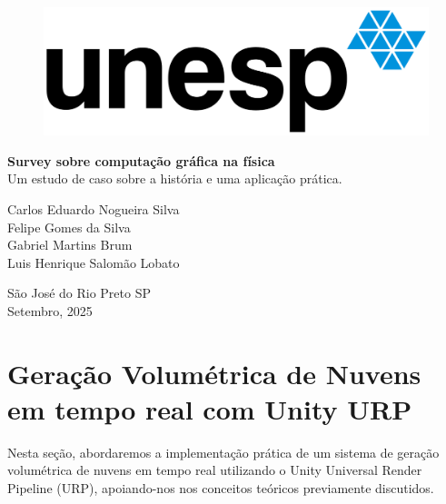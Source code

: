 \documentclass[12pt,a4paper]{article}
\begin{document}
\begin{titlepage}
	\begin{center}

\begin{figure}[H]
    \centering
    \includegraphics[width=0.5\linewidth]{img/LogoUnesp.png}
\end{figure}

	\vspace{5cm}
    \textbf{\Huge{Survey sobre computação gráfica na física}} \\
    \vspace{5pt}
    Um estudo de caso sobre a história e uma aplicação prática.
        
	\vspace{5cm}
    Carlos Eduardo Nogueira Silva \\
    Felipe Gomes da Silva \\
    Gabriel Martins Brum \\
    Luis Henrique Salomão Lobato \\
	\end{center}
	
	\vspace{1cm}
	\begin{center}
		\vspace{\fill}
    \large{São José do Rio Preto \- SP}\\
    \large{Setembro, 2025} 
	\end{center}
\end{titlepage}

\tableofcontents

\newpage

\newpage






\section{Geração Volumétrica de Nuvens em tempo real com Unity URP}
Nesta seção, abordaremos a implementação prática de um sistema de geração volumétrica de nuvens em tempo real utilizando o Unity Universal Render Pipeline (URP), apoiando-nos nos conceitos teóricos previamente discutidos. 







\newpage


\end{document}
